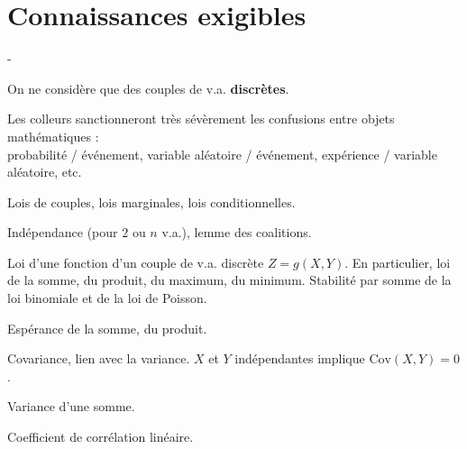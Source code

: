 \documentclass[11pt]{article}%
\begin{document}
\newpage


\section*{Connaissances exigibles}


\begin{noliste}{-}
  \item On ne considère que des couples de v.a. {\bf discrètes}.
  \item Les colleurs sanctionneront très sévèrement les confusions entre 
  objets mathématiques :\\ 
  probabilité / événement, variable aléatoire / 
  événement, expérience / variable aléatoire, etc.
  \item Lois de couples, lois marginales, lois conditionnelles.
  \item Indépendance (pour $2$ ou $n$ v.a.), lemme des coalitions.
  \item Loi d'une fonction d'un couple de v.a. discrète $Z=g(X,Y)$. En 
  particulier, loi de la somme, du produit, du maximum, du minimum. 
  Stabilité par somme de la loi binomiale et de la loi de Poisson.
  \item Espérance de la somme, du produit.
  \item Covariance, lien avec la variance. $X$ et $Y$ indépendantes 
  implique $\text{Cov}(X,Y)=0$.
  \item Variance d'une somme.
  \item Coefficient de corrélation linéaire.
\end{noliste}
\end{document}
